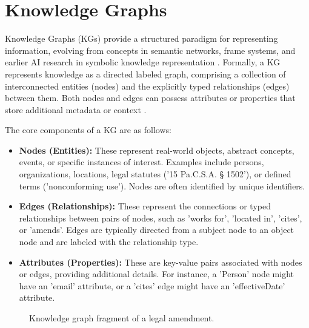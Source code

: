\section{Knowledge Graphs}
Knowledge Graphs (KGs) provide a structured paradigm for representing information, evolving from concepts in semantic networks, frame systems, and earlier AI research in symbolic knowledge representation \parencite{RefWorks:RefID:102-hogan2021knowledge}. Formally, a KG represents knowledge as a directed labeled graph, comprising a collection of interconnected entities (nodes) and the explicitly typed relationships (edges) between them. Both nodes and edges can possess attributes or properties that store additional metadata or context \parencite{RefWorks:RefID:108-ehrlinger2016definition, RefWorks:RefID:97-cong2024research}.

The core components of a KG are as follows:
\begin{itemize}
    \item \textbf{Nodes (Entities):} These represent real-world objects, abstract concepts, events, or specific instances of interest. Examples include persons, organizations, locations, legal statutes ('15 Pa.C.S.A. § 1502'), or defined terms ('nonconforming use'). Nodes are often identified by unique identifiers.
    \item \textbf{Edges (Relationships):} These represent the connections or typed relationships between pairs of nodes, such as 'works for', 'located in', 'cites', or 'amends'. Edges are typically directed from a subject node to an object node and are labeled with the relationship type.
    \item \textbf{Attributes (Properties):} These are key-value pairs associated with nodes or edges, providing additional details. For instance, a 'Person' node might have an 'email' attribute, or a 'cites' edge might have an 'effectiveDate' attribute.
\end{itemize}

\begin{figure}[H]
\centering
\caption{Knowledge graph fragment of a legal amendment.}
\label{fig:simple_kg}
\end{figure}

